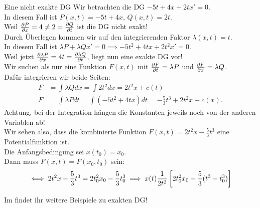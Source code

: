\begin{Beispiel}
{Eine nicht exakte DG}
Wir betrachten die DG $\boxed{-5t+4x+2tx'=0}$.\\
In diesem Fall ist $P(x,t)=-5t+4x$, $Q(x,t)=2t$.\\
Weil $\frac{\partial P}{\partial x}=4\neq2=\frac{\partial Q}{\partial t}$ ist die DG nicht exakt!\\
Durch Überlegen kommen wir auf den integrierenden Faktor $\lambda(x,t)=t$.\\
In diesem Fall ist $\lambda P+\lambda Qx'=0\implies -5t^2+4tx+2t^2x'=0$.\\
Weil jetzt $\frac{\partial\lambda P}{\partial x}=4t=\frac{\partial\lambda Q}{\partial t}$, liegt nun eine exakte DG vor!\\
Wir suchen als nur eine Funktion $F(x,t)$ mit $\frac{\partial F}{\partial t}=\lambda P$ und $\frac{\partial F}{\partial x}=\lambda Q$.\\
Dafür integrieren wir beide Seiten:
\begin{align*}
    F&=\int \lambda Q dx=\int 2t^2dx=2t^2x+c(t)\\
    F&=\int \lambda P dt=\int(-5t^2+4tx)dt=-\frac{5}{3}t^3+2t^2x+c(x).
\end{align*}
Achtung, bei der Integration hängen die Konstanten jeweils noch von der anderen Variablen ab!\\
Wir sehen also, dass die kombinierte Funktion $F(x,t)=2t^2x-\frac{5}{3}t^3$ eine Potentialfunktion ist.\\
Die Anfangsbedingung sei $x(t_0)=x_0$.\\
Dann muss $F(x,t)=F(x_0,t_0)$ sein:
\begin{equation*}
    \iff 2t^2x-\frac{5}{3}t^3=2t_0^2x_0-\frac{5}{3}t_0^3\implies x(t)\frac{1}{2t^2}\left[{2t_0^2x_0+\frac{5}{3}(t^3-t_0^3)}\right]
\end{equation*}
\end{Beispiel}
Im \Skript{} findet ihr weitere Beispiele zu exakten DG!

